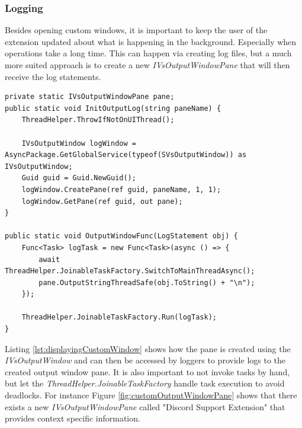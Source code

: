 \subsubsection{Logging}
Besides opening custom windows, it is important to keep the user of the extension updated about what is happening in the background. Especially when operations take a long time. This can happen via creating log files, but a much more suited approach is to create a new \textit{IVsOutputWindowPane} that will then receive the log statements.
\begin{lstlisting}[style=CSharp, caption={Displaying a custom window}, label={lst:displayingCustomWindow}]
private static IVsOutputWindowPane pane;
public static void InitOutputLog(string paneName) {
	ThreadHelper.ThrowIfNotOnUIThread();
	
	IVsOutputWindow logWindow = AsyncPackage.GetGlobalService(typeof(SVsOutputWindow)) as IVsOutputWindow;
	Guid guid = Guid.NewGuid();
	logWindow.CreatePane(ref guid, paneName, 1, 1);
	logWindow.GetPane(ref guid, out pane);
}

public static void OutputWindowFunc(LogStatement obj) {
	Func<Task> logTask = new Func<Task>(async () => {
		await ThreadHelper.JoinableTaskFactory.SwitchToMainThreadAsync();
		pane.OutputStringThreadSafe(obj.ToString() + "\n");
	});
	
	ThreadHelper.JoinableTaskFactory.Run(logTask);
}
\end{lstlisting}
Listing \ref{lst:displayingCustomWindow} shows how the pane is created using the \textit{IVsOutputWindow} and can then be accessed by loggers to provide logs to the created output window pane. It is also important to not invoke tasks by hand, but let the \textit{ThreadHelper.JoinableTaskFactory} handle task execution to avoid deadlocks.
For instance Figure \ref{fig:customOutputWindowPane} shows that there exists a new \textit{IVsOutputWindowPane} called "Discord Support Extension" that provides context specific information.
\newpage
